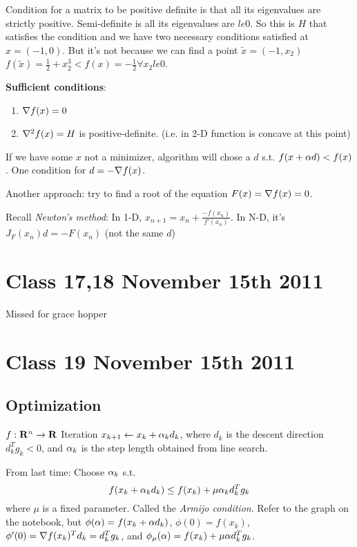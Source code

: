 Condition for a matrix to be positive definite is that all its
eigenvalues are strictly positive. Semi-definite is all its
eigenvalues are $le 0$. So this is $H$ that satisfies the condition
and we have two necessary conditions satisfied at $x=(-1, 0)$.
But it's not because we can find a point $\tilde x=(-1, x_2)$
$f(\tilde x) = \frac{1}{2} + x_2^3 < f(x) = -\frac{1}{2} \forall x_2
le 0$.

\textbf{Sufficient conditions}:
\begin{enumerate}
\item $\nabla f(x) = 0$
\item $\nabla^2 f(x) = H$ is positive-definite. (i.e. in 2-D function
  is concave at this point)
\end{enumerate}

If we have some $x$ not a minimizer, algorithm will chose a $d$
s.t. $f(x+\alpha d) < f(x)$. One condition for $d = -\nabla f(x)$.

Another approach: try to find a root of the equation $F(x) = \nabla
f(x) = 0$.

Recall \emph{Newton's method}: In 1-D, $x_{n+1} = x_{n} +
\frac{-f(x_n)}{f'(x_n)}$.
In N-D, it's $J_F(x_n)d = -F(x_n)$ (not the same $d$)

\pagebreak
\section{Class 17,18 November 15th 2011} Missed for grace hopper 
% 
\section{Class 19 November 15th 2011}
% 
\label{sec:class19}

\subsection{Optimization}
$f:\mathbf{R}^n \rightarrow \mathbf{R}$ Iteration $x_{k+1} \leftarrow x_k +\alpha_k
d_k$, where $d_k$ is the descent direction $d_k^Tg_k < 0$, and $\alpha_k$
is the step length obtained from line search.

From last time: Choose $\alpha_k$ s.t. $$f(x_k+\alpha_kd_k) \le f(x_k) + \mu
\alpha_kd_k^Tg_k$$ where $\mu$ is a fixed parameter. Called the \emph{Armijo condition}.
Refer to the graph on the notebook, but $\phi(\alpha) = f(x_k+\alpha d_k)$,
$\phi(0) = f(x_k)$, $\phi'(0) = \nabla f (x_k)^Td_k = d_k^Tg_k$, and
$\phi_\mu(\alpha) = f(x_k) + \mu\alpha d_k^Tg_k$.

